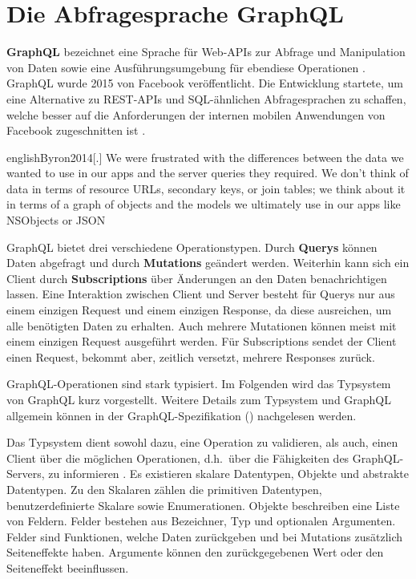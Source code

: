 \section{Die Abfragesprache GraphQL}\label{sec:theory|graphql}

\textbf{GraphQL} bezeichnet eine Sprache für Web-APIs zur Abfrage und Manipulation von Daten sowie eine Ausführungsumgebung für ebendiese Operationen \autocite{Facebook2018}. GraphQL wurde 2015 von Facebook veröffentlicht. Die Entwicklung startete, um eine Alternative zu REST-APIs und SQL-ähnlichen Abfragesprachen zu schaffen, welche besser auf die Anforderungen der internen mobilen Anwendungen von Facebook zugeschnitten ist \autocite{Byron2014}.

\begin{foreigndisplaycquote}{english}{Byron2014}[.]
    We were frustrated with the differences between the data we wanted to use in our apps and the server queries they required. We don’t think of data in terms of resource URLs, secondary keys, or join tables; we think about it in terms of a graph of objects and the models we ultimately use in our apps like NSObjects or JSON
\end{foreigndisplaycquote}

\noindent{}GraphQL bietet drei verschiedene Operationstypen. Durch \textbf{Querys} können Daten abgefragt und durch \textbf{Mutations} geändert werden. Weiterhin kann sich ein Client durch \textbf{Subscriptions} über Änderungen an den Daten benachrichtigen lassen. Eine Interaktion zwischen Client und Server besteht für Querys nur aus einem einzigen Request und einem einzigen Response, da diese ausreichen, um alle benötigten Daten zu erhalten. Auch mehrere Mutationen können meist mit einem einzigen Request ausgeführt werden. Für Subscriptions sendet der Client einen Request, bekommt aber, zeitlich versetzt, mehrere Responses zurück.

GraphQL-Operationen sind stark typisiert. Im Folgenden wird das Typsystem von GraphQL kurz vorgestellt. Weitere Details zum Typsystem und GraphQL allgemein können in der GraphQL-Spezifikation (\autocite{Facebook2018}) nachgelesen werden.

Das Typsystem dient sowohl dazu, eine Operation zu validieren, als auch, einen Client über die möglichen Operationen, d.h.\ über die Fähigkeiten des GraphQL-Servers, zu informieren \autocite[Abs.~3]{Facebook2018}. Es existieren skalare Datentypen, Objekte und abstrakte Datentypen. Zu den Skalaren zählen die primitiven Datentypen, benutzerdefinierte Skalare sowie Enumerationen. Objekte beschreiben eine Liste von Feldern. Felder bestehen aus Bezeichner, Typ und optionalen Argumenten. Felder sind Funktionen, welche Daten zurückgeben und bei Mutations zusätzlich Seiteneffekte haben\footnotemark{}. Argumente können den zurückgegebenen Wert oder den Seiteneffekt beeinflussen.

